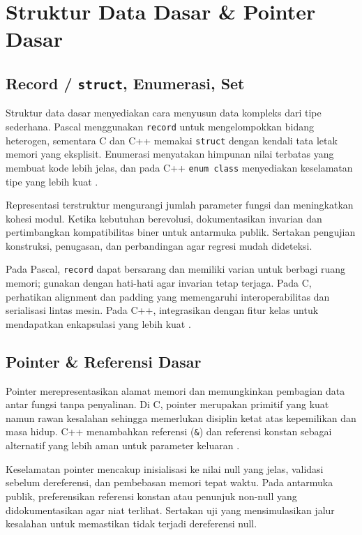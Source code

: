 \documentclass[../main.tex]{subfiles}
\begin{document}
\chapter{Struktur Data Dasar \& Pointer Dasar}
\section{Record / \texttt{struct}, Enumerasi, Set}
Struktur data dasar menyediakan cara menyusun data kompleks dari tipe sederhana. Pascal menggunakan \texttt{record} untuk mengelompokkan bidang heterogen, sementara C dan C++ memakai \texttt{struct} dengan kendali tata letak memori yang eksplisit. Enumerasi menyatakan himpunan nilai terbatas yang membuat kode lebih jelas, dan pada C++ \texttt{enum class} menyediakan keselamatan tipe yang lebih kuat \parencite{pascal-structs,c-struct,cpp-struct-class}.

Representasi terstruktur mengurangi jumlah parameter fungsi dan meningkatkan kohesi modul. Ketika kebutuhan berevolusi, dokumentasikan invarian dan pertimbangkan kompatibilitas biner untuk antarmuka publik. Sertakan pengujian konstruksi, penugasan, dan perbandingan agar regresi mudah dideteksi.

Pada Pascal, \texttt{record} dapat bersarang dan memiliki varian untuk berbagi ruang memori; gunakan dengan hati-hati agar invarian tetap terjaga. Pada C, perhatikan alignment dan padding yang memengaruhi interoperabilitas dan serialisasi lintas mesin. Pada C++, integrasikan dengan fitur kelas untuk mendapatkan enkapsulasi yang lebih kuat \parencite{pascal-structs,c-struct,cpp-struct-class}.

\section{Pointer \& Referensi Dasar}
Pointer merepresentasikan alamat memori dan memungkinkan pembagian data antar fungsi tanpa penyalinan. Di C, pointer merupakan primitif yang kuat namun rawan kesalahan sehingga memerlukan disiplin ketat atas kepemilikan dan masa hidup. C++ menambahkan referensi (\texttt{\&}) dan referensi konstan sebagai alternatif yang lebih aman untuk parameter keluaran \parencite{gnu-c-manual,cpp-reference}.

Keselamatan pointer mencakup inisialisasi ke nilai null yang jelas, validasi sebelum dereferensi, dan pembebasan memori tepat waktu. Pada antarmuka publik, preferensikan referensi konstan atau penunjuk non-null yang didokumentasikan agar niat terlihat. Sertakan uji yang mensimulasikan jalur kesalahan untuk memastikan tidak terjadi dereferensi null.
\end{document}

